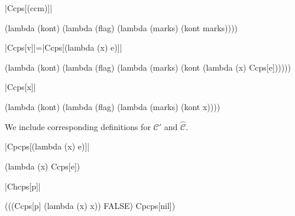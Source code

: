 \begin{schemedefinition}{\scheme|Ccps[(ccm)]|}
\begin{schemeblock}
\begin{schemedisplay}
(lambda (kont)
  (lambda (flag)
    (lambda (marks)
      (kont marks))))
\end{schemedisplay}
\end{schemeblock}
\end{schemedefinition}

\begin{schemedefinition}{\scheme|Ccps[v]|=\scheme|Ccps[(lambda (x) e)]|}
\begin{schemeblock}
\begin{schemedisplay}
(lambda (kont)
  (lambda (flag)
    (lambda (marks)
      (kont (lambda (x) Ccps[e])))))
\end{schemedisplay}
\end{schemeblock}
\end{schemedefinition}

\begin{schemedefinition}{\scheme|Ccps[x]|}
\begin{schemeblock}
\begin{schemedisplay}
(lambda (kont)
  (lambda (flag)
    (lambda (marks)
      (kont x))))
\end{schemedisplay}
\end{schemeblock}
\end{schemedefinition}

We include corresponding definitions for $\mathcal{C}'$ and $\hat{\mathcal{C}}$.

\begin{schemedefinition}{\scheme|Cpcps[(lambda (x) e)]|}
\begin{schemeblock}
\begin{schemedisplay}
(lambda (x) Ccps[e])
\end{schemedisplay}
\end{schemeblock}
\end{schemedefinition}

\begin{schemedefinition}{\scheme|Chcps[p]|}
\begin{schemeblock}
\begin{schemedisplay}
(((Ccps[p] (lambda (x) x)) FALSE) Cpcps[nil])
\end{schemedisplay}
\end{schemeblock}
\end{schemedefinition}

